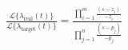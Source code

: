 \documentclass[convert={outext=.svg,density=750}]{standalone}
\begin{document}
$
    \frac{\mathcal{L}\{\lambda_{\text{real}}(t)\}}{\mathcal{L}\{\lambda_{\text{target}}(t)\}}=
    \frac{\prod\limits_{i=1}^m \frac{(s-z_i)}{-z_i}}{\prod\limits_{j=1}^n \frac{(s-p_j)}{-p_j}}
$
\end{document}

